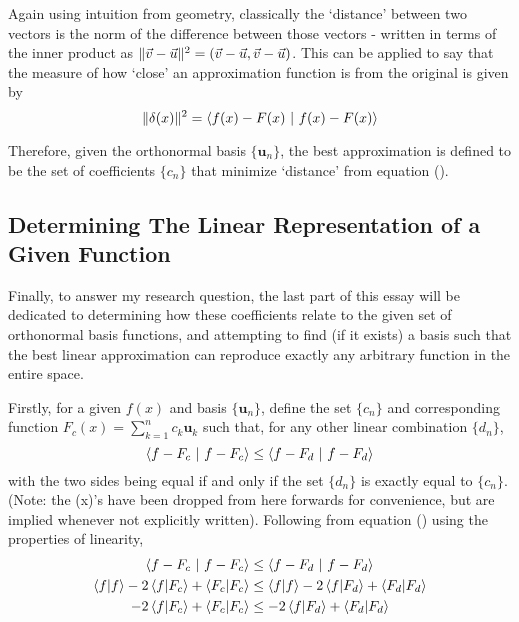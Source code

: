 \documentclass{article}
\newcommand{\B}[1]{\boldsymbol{#1}}
\newcommand*\basisSet{\{\B{u}_n\}}
\DeclarePairedDelimiter\norm{\lVert}{\rVert}%
\theoremstyle{definition}
\theoremstyle{remark}
\begin{document}
Again using intuition from geometry, classically the `distance' between two vectors is 
the norm of the difference between those vectors - written in terms of the inner product as 
$\norm{\vec{v} - \vec{u}}^2 = (\vec{v} - \vec{u}, \vec{v} - \vec{u})$. This can be applied to 
say that the measure of how `close' an approximation function is from the original is given by 
\begin{equation}
  \norm{\delta(x)}^2 = \braket{f(x) - F(x) ~| ~f(x) - F(x)}
  \label{eq:distEq}
\end{equation}

Therefore, given the orthonormal basis $\basisSet$, the best approximation is defined 
to be the set of coefficients $\{c_n\}$ that minimize `distance' from equation ().

\subsection{Determining The Linear Representation of a Given Function}

Finally, to answer my research question, the last part of this essay will be dedicated
to determining how these coefficients relate to the given set of orthonormal basis functions, 
and attempting to find (if it exists) a basis such that the best linear approximation can reproduce exactly
any arbitrary function in the entire space.

Firstly, for a given $f(x)$ and basis $\basisSet$, define the set $\{c_n\}$ and corresponding function $F_c(x) = \sum_{k=1}^n c_k \B{u}_k$
such that, for any other linear combination $\{d_n\}$,
\begin{equation}
  \braket{f- F_c ~| ~ f - F_c} \leq \braket{f - F_d ~ | ~ f - F_d}
  \label{eq:bestApprox}
\end{equation}
with the two sides being equal if and only if the set $\{d_n\}$ is exactly equal to $\{c_n\}$.
(Note: the (x)'s have been dropped from here forwards for convenience, but are implied whenever not explicitly written).
Following from equation () using the properties of 
linearity,
\begin{align}
  \braket{f- F_c ~| ~ f - F_c} &\leq \braket{f - F_d ~ | ~ f - F_d} \nonumber\\
  \braket{f|f} - 2\braket{f|F_c} + \braket{F_c|F_c} &\leq \braket{f|f} - 2\braket{f|F_d} + \braket{F_d|F_d} \nonumber\\
  - 2\braket{f|F_c} + \braket{F_c|F_c} &\leq - 2\braket{f|F_d} + \braket{F_d|F_d} 
  \label{eq:8}
\end{align}
\end{document}
